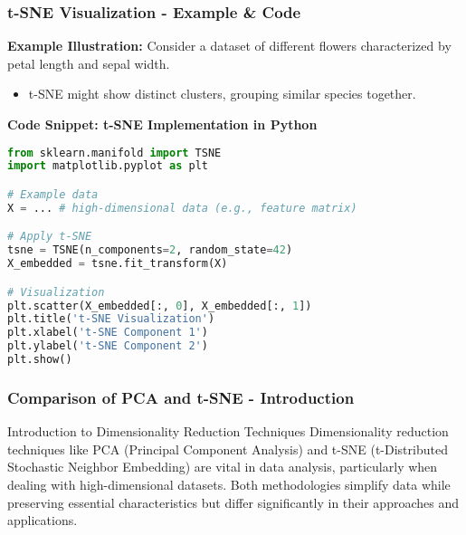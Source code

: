 \documentclass{beamer}
\begin{document}
\begin{frame}[fragile]
    \frametitle{t-SNE Visualization - Example & Code}
    \textbf{Example Illustration:}
    Consider a dataset of different flowers characterized by petal length and sepal width.
    \begin{itemize}
        \item t-SNE might show distinct clusters, grouping similar species together.
    \end{itemize}

    \textbf{Code Snippet: t-SNE Implementation in Python}
    \begin{lstlisting}[language=Python]
from sklearn.manifold import TSNE
import matplotlib.pyplot as plt

# Example data
X = ... # high-dimensional data (e.g., feature matrix)

# Apply t-SNE
tsne = TSNE(n_components=2, random_state=42)
X_embedded = tsne.fit_transform(X)

# Visualization
plt.scatter(X_embedded[:, 0], X_embedded[:, 1])
plt.title('t-SNE Visualization')
plt.xlabel('t-SNE Component 1')
plt.ylabel('t-SNE Component 2')
plt.show()
    \end{lstlisting}
\end{frame}

\begin{frame}[fragile]
    \frametitle{Comparison of PCA and t-SNE - Introduction}
    
    \begin{block}{Introduction to Dimensionality Reduction Techniques}
        Dimensionality reduction techniques like PCA (Principal Component Analysis) and t-SNE (t-Distributed Stochastic Neighbor Embedding) are vital in data analysis, particularly when dealing with high-dimensional datasets. 
        Both methodologies simplify data while preserving essential characteristics but differ significantly in their approaches and applications.
    \end{block}
\end{frame}
\end{document}
